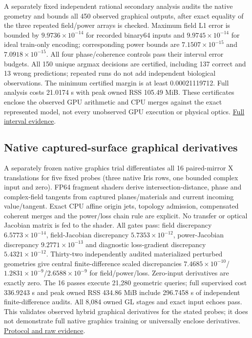 \documentclass[11pt]{article}
\begin{document}
A separately fixed independent rational secondary analysis audits the native geometry and bounds all 450 observed graphical outputs, after exact equality of the three repeated field/power arrays is checked. Maximum field L1 error is bounded by $9.9736\times10^{-14}$ for recorded binary64 inputs and $9.9745\times10^{-14}$ for ideal train-only encoding; corresponding power bounds are $7.1507\times10^{-15}$ and $7.0918\times10^{-15}$. All four phase/coherence controls pass their interval error budgets. All 150 unique argmax decisions are certified, including 137 correct and 13 wrong predictions; repeated runs do not add independent biological observations. The minimum certified margin is at least 0.00021119712. Full analysis costs 21.0174 s with peak owned RSS 105.49 MiB. These certificates enclose the observed GPU arithmetic and CPU merges against the exact represented model, not every unobserved GPU execution or physical optics. \href{https://github.com/Agnuxo1/Neuro3D/blob/a6d0fbec5011bdc76abad71edac86519016348f4/Docs/NATIVE\_GRAPHICS\_FIELD\_CERTIFICATE\_PROTOCOL\_2026-10-09.md}{Full interval evidence}.

\subsection*{Native captured-surface graphical derivatives}

A separately frozen native graphics trial differentiates all 16 paired-mirror X translations for five fixed probes (three native Iris rows, one bounded complex input and zero). FP64 fragment shaders derive intersection-distance, phase and complex-field tangents from captured planes/materials and current incoming value/tangent. Exact CPU affine origin jets, topology admission, compensated coherent merges and the power/loss chain rule are explicit. No transfer or optical Jacobian matrix is fed to the shader. All gates pass: field discrepancy $6.5773\times10^{-14}$, field-Jacobian discrepancy $5.7353\times10^{-12}$, power-Jacobian discrepancy $9.2771\times10^{-13}$ and diagnostic loss-gradient discrepancy $5.4321\times10^{-12}$. Thirty-two independently audited materialized perturbed geometries give central finite-difference scaled discrepancies $7.4685\times10^{-10}$/$1.2831\times10^{-9}$/$2.6588\times10^{-9}$ for field/power/loss. Zero-input derivatives are exactly zero. The 16 passes execute 21,280 geometric queries; full supervised cost 336.9243 s and peak owned RSS 434.86 MiB include 296.7458 s of independent finite-difference audits. All 8,084 owned GL stages and exact input echoes pass. This validates observed hybrid graphical derivatives for the stated probes; it does not demonstrate full native graphics training or universally enclose derivatives. \href{https://github.com/Agnuxo1/Neuro3D/blob/a6d0fbec5011bdc76abad71edac86519016348f4/Docs/NATIVE\_GRAPHICS\_GEOMETRY\_GRADIENT\_PROTOCOL\_2026-10-09.md}{Protocol and raw evidence}.
\end{document}
